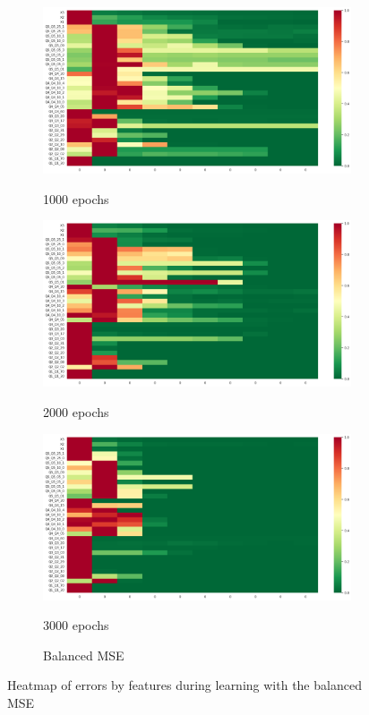 \documentclass{article}
\theoremstyle{definition}
\begin{document}
\begin{figure}[H]
     \centering
     \begin{subfigure}[b]{0.49\textwidth}
         \centering
         \includegraphics[width=\textwidth]{imgs/Illu/1000Epochs/Imb/SAM_covariates_heatmap.png}
         \caption{1000 epochs}
         \quad
         \includegraphics[width=\textwidth]{imgs/Illu/2000Epochs/Imb/SAM_covariates_heatmap.png}
         \caption{2000 epochs}
         \quad
         \includegraphics[width=\textwidth]{imgs/Illu/3000Epochs/Imb/SAM_covariates_heatmap.png}
         \caption{3000 epochs}
         \caption{Balanced MSE}
     \end{subfigure}
     \caption{Heatmap of errors by features during learning with the balanced MSE}
\end{figure}
\end{document}

